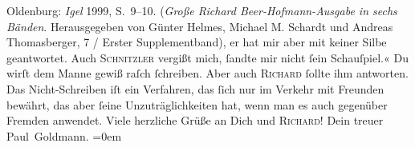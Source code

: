 \begin{ledgroupsized}[t]{13cm}
{{{                     Oldenburg: \emph{Igel}{ }1999, S. 9–10. (\emph{Große Richard
                        Beer-Hofmann-Ausgabe in sechs Bänden}. Herausgegeben von Günter Helmes, Michael
                     M. Schardt und Andreas Thomasberger, 7 / Erster Supplementband)}}}\label{K_L02800-3h}, er hat mir aber mit keiner Silbe geantwortet. Auch \textsc{Schnitzler} vergißt mich, ſandte mir nicht ſein Schauſpiel.«\pend
           \pstart
           {\pb}Du wirſt dem Manne gewiß raſch ſchreiben. Aber auch \textsc{Richard} ſollte ihm antworten. Das Nicht-Schreiben iſt ein Verfahren, das ſich nur im
               Verkehr mit Freunden bewährt, das aber ſeine Unzuträglichkeiten hat, wenn man es auch
               gegenüber Fremden  anwendet.\pend
           \pstart
           Viele herzliche Grüße an Dich und \textsc{Richard}!\pend
           \pstart
           Dein treuer {\\[\baselineskip]}\spacefill\mbox{Paul Goldmann.}\pend
           \leftskip=0em{}
         
         \endnumbering{}\end{ledgroupsized}  \newcommand{\dateiname}{L02800}\newcommand{\titel}{Paul Goldmann an Arthur Schnitzler, 8. 1. [1897]}\newcommand{\editorInnen}{Martin Anton Müller und Laura Untner}
      